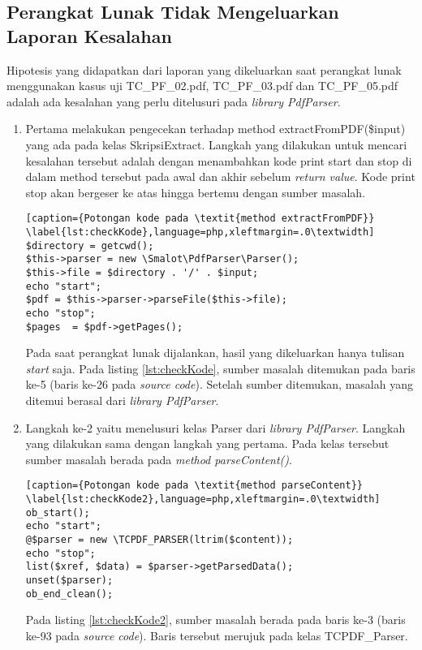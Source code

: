 \subsection{Perangkat Lunak Tidak Mengeluarkan Laporan Kesalahan}
\label{kosong}
Hipotesis yang didapatkan dari laporan yang dikeluarkan saat perangkat lunak menggunakan kasus uji TC\_PF\_02.pdf, TC\_PF\_03.pdf dan TC\_PF\_05.pdf adalah ada kesalahan yang perlu ditelusuri pada \textit{library PdfParser}.

\begin{enumerate}
	\item Pertama melakukan pengecekan terhadap method extractFromPDF(\$input) yang ada pada kelas SkripsiExtract. Langkah yang dilakukan untuk mencari kesalahan tersebut adalah dengan menambahkan kode print start dan stop di dalam method tersebut pada awal dan akhir sebelum \textit{return value}. Kode print stop akan bergeser ke atas hingga bertemu dengan sumber masalah. 
	
\begin{lstlisting}[caption={Potongan kode pada \textit{method extractFromPDF}}	\label{lst:checkKode},language=php,xleftmargin=.0\textwidth]
$directory = getcwd();
$this->parser = new \Smalot\PdfParser\Parser();
$this->file = $directory . '/' . $input;
echo "start";
$pdf = $this->parser->parseFile($this->file);
echo "stop";
$pages  = $pdf->getPages();
\end{lstlisting}

Pada saat perangkat lunak dijalankan, hasil yang dikeluarkan hanya tulisan \textit{start} saja. Pada listing \ref{lst:checkKode}, sumber masalah ditemukan pada baris ke-5 (baris ke-26 pada \textit{source code}). Setelah sumber ditemukan, masalah yang ditemui berasal dari \textit{library PdfParser}.
	
	\item Langkah ke-2 yaitu menelusuri kelas Parser dari \textit{library PdfParser}. Langkah yang dilakukan sama dengan langkah yang pertama. Pada kelas tersebut sumber masalah berada pada \textit{method parseContent()}.
	
\begin{lstlisting}[caption={Potongan kode pada \textit{method parseContent}}	\label{lst:checkKode2},language=php,xleftmargin=.0\textwidth]
ob_start();
echo "start";
@$parser = new \TCPDF_PARSER(ltrim($content));
echo "stop";
list($xref, $data) = $parser->getParsedData();
unset($parser);
ob_end_clean();
\end{lstlisting}
	
	Pada listing \ref{lst:checkKode2}, sumber masalah berada pada baris ke-3 (baris ke-93 pada \textit{source code}). Baris tersebut merujuk pada kelas TCPDF\_Parser.	
	

\end{enumerate}
